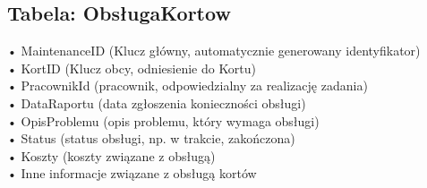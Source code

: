 \documentclass{article}
\begin{document}
\subsection*{Tabela: ObsługaKortow}
•	MaintenanceID (Klucz główny, automatycznie generowany identyfikator)\\
•	KortID (Klucz obcy, odniesienie do Kortu)\\
•	PracownikId (pracownik, odpowiedzialny za realizację zadania)\\
•	DataRaportu (data zgłoszenia konieczności obsługi)\\
•	OpisProblemu (opis problemu, który wymaga obsługi)\\
•	Status (status obsługi, np. w trakcie, zakończona)\\
•	Koszty (koszty związane z obsługą)\\
•	Inne informacje związane z obsługą kortów
\end{document}
